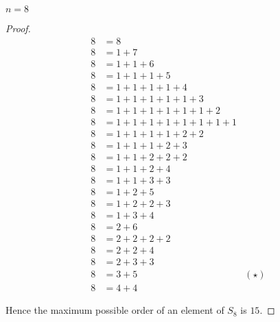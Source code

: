 \begin{exercise}
    $n = 8$
\end{exercise}

\begin{proof}
    \begin{align*}
        8 & = 8                                       \\
        8 & = 1 + 7                                   \\
        8 & = 1 + 1 + 6                               \\
        8 & = 1 + 1 + 1 + 5                           \\
        8 & = 1 + 1 + 1 + 1 + 4                       \\
        8 & = 1 + 1 + 1 + 1 + 1 + 3                   \\
        8 & = 1 + 1 + 1 + 1 + 1 + 1 + 2               \\
        8 & = 1 + 1 + 1 + 1 + 1 + 1 + 1 + 1           \\
        8 & = 1 + 1 + 1 + 1 + 2 + 2                   \\
        8 & = 1 + 1 + 1 + 2 + 3                       \\
        8 & = 1 + 1 + 2 + 2 + 2                       \\
        8 & = 1 + 1 + 2 + 4                           \\
        8 & = 1 + 1 + 3 + 3                           \\
        8 & = 1 + 2 + 5                               \\
        8 & = 1 + 2 + 2 + 3                           \\
        8 & = 1 + 3 + 4                               \\
        8 & = 2 + 6                                   \\
        8 & = 2 + 2 + 2 + 2                           \\
        8 & = 2 + 2 + 4                               \\
        8 & = 2 + 3 + 3                               \\
        8 & = 3 + 5                         & (\star) \\
        8 & = 4 + 4
    \end{align*}

    Hence the maximum possible order of an element of $S_{8}$ is $15$.
\end{proof}

